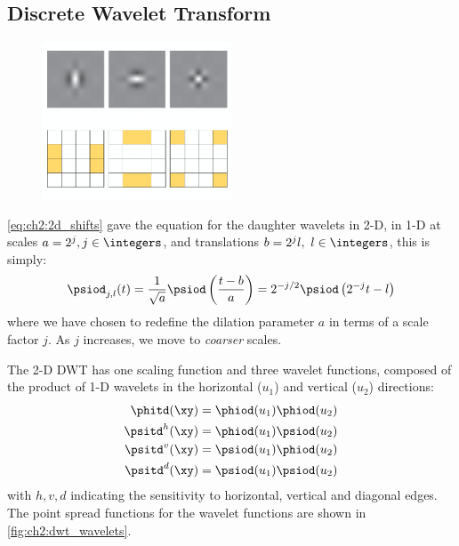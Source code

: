 \subsection{Discrete Wavelet Transform}\label{sec:ch2:dwt_problems}
  \begin{figure}
    \centering
    \includegraphics[width=0.5\textwidth]{litreview/images/dwt_wavelets.png}
      \label{fig:ch2:dwt_wavelets}
  \end{figure}

  \eqref{eq:ch2:2d_shifts} gave the equation for the daughter wavelets in 2-D,
  in 1-D at scales $a=2^{j}, j \in \integers$, and translations $b = 2^j l,\ l \in \integers$, this is simply:
  \begin{equation}
    \psiod_{j, l}(t) = \frac{1}{\sqrt{a}} \psiod\left(\frac{t-b}{a}\right) = 2^{-j/2} \psiod\left(2^{-j}t- l \right)
  \end{equation}
  where we have chosen to redefine the dilation parameter $a$ in terms of a scale
  factor $j$. As $j$ increases, we move to \emph{coarser} scales.

  The 2-D DWT has one scaling function and three wavelet functions, composed of
  the product of 1-D wavelets in the horizontal ($u_1$) and vertical ($u_2$) directions:
  \begin{align}
    \phitd(\xy) &= \phiod(u_1)\phiod(u_2) \label{eq:ch2:dwt1}\\
    \psitd^h(\xy) &= \phiod(u_1) \psiod(u_2) \\
    \psitd^v(\xy) & = \psiod(u_1) \phiod(u_2) \\
    \psitd^d(\xy) & = \psiod(u_1) \psiod(u_2) \label{eq:ch2:dwt4}
  \end{align}
  with $h, v, d$ indicating the sensitivity to horizontal, vertical and diagonal
  edges. The point spread functions for the wavelet functions are shown in
  \autoref{fig:ch2:dwt_wavelets}.

